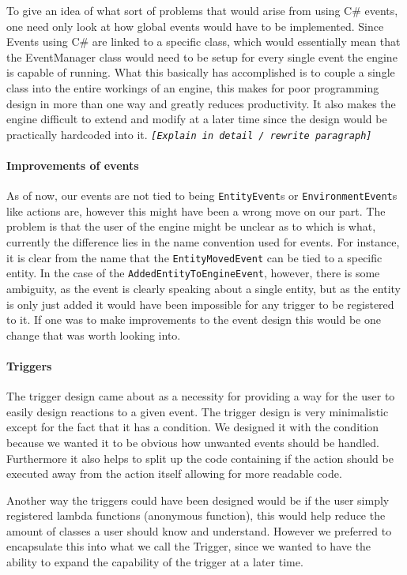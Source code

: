To give an idea of what sort of problems that would arise from using
C\# events, one need only look at how global events would have to
be implemented. Since Events using C\# are linked to a specific class,
which would essentially mean that the EventManager class would need
to be setup for every single event the engine is capable of running.
What this basically has accomplished is to couple a single class into
the entire workings of an engine, this makes for poor programming
design in more than one way and greatly reduces productivity. It also
makes the engine difficult to extend and modify at a later time since
the design would be practically hardcoded into it. \texttt{\emph{{[}Explain
in detail / rewrite paragraph{]}}}


\paragraph*{Improvements of events}

As of now, our events are not tied to being \texttt{EntityEvent}s
or \texttt{EnvironmentEvent}s like actions are, however this might
have been a wrong move on our part. The problem is that the user of
the engine might be unclear as to which is what, currently the difference
lies in the name convention used for events. For instance, it is clear
from the name that the \texttt{EntityMovedEvent} can be tied to a
specific entity. In the case of the \texttt{AddedEntityToEngineEvent},
however, there is some ambiguity, as the event is clearly speaking
about a single entity, but as the entity is only just added it would
have been impossible for any trigger to be registered to it. If one
was to make improvements to the event design this would be one change
that was worth looking into.


\paragraph*{Triggers}

The trigger design came about as a necessity for providing a way for
the user to easily design reactions to a given event. The trigger
design is very minimalistic except for the fact that it has a condition.
We designed it with the condition because we wanted it to be obvious
how unwanted events should be handled. Furthermore it also helps to
split up the code containing if the action should be executed away
from the action itself allowing for more readable code. 

Another way the triggers could have been designed would be if the
user simply registered lambda functions (anonymous function), this
would help reduce the amount of classes a user should know and understand.
However we preferred to encapsulate this into what we call the Trigger,
since we wanted to have the ability to expand the capability of the
trigger at a later time.

